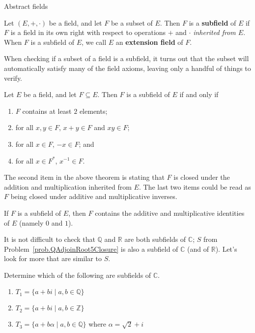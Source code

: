 \begin{section}{Abstract fields}
\begin{definition}
Let $(E,+,\cdot)$ be a field, and let $F$ be a subset of $E$. Then $F$ is a \textbf{subfield} of $E$ if $F$ is a field in its own right with respect to operations $+$ and $\cdot$ \emph{inherited from $E$}. When $F$ is a subfield of $E$, we call $E$  an \textbf{extension field} of $F$.
\end{definition}

When checking if a subset of a field is a subfield, it turns out that the subset will automatically satisfy many of the field axioms, leaving only a handful of things to verify.

\begin{theorem}
Let $E$ be a field, and let $F\subseteq E$. Then $F$ is a subfield of $E$ if and only if 
\begin{enumerate}
\item $F$ contains at least $2$ elements;
\item for all $x,y\in F$, $x+y\in F$ and  $xy\in F$;
\item for all $x\in F$, $-x\in F$; and 
\item for all $x\in F^*$, $x^{-1}\in F$.
\end{enumerate}
\end{theorem}

The second item in the above theorem is stating that $F$ is closed under the addition and multiplication inherited from $E$. The last two items could be read as $F$ being closed under additive and multiplicative inverses.

\begin{theorem}\label{thm.SubfieldContains01}
If $F$ is a subfield of $E$, then $F$ contains the additive and multiplicative identities of $E$ (namely $0$ and $1$).
\end{theorem}

It is not difficult to check that $\mathbb{Q}$ and $\mathbb{R}$ are both subfields of $\mathbb{C}$; $S$ from Problem~\ref{prob.QAdjoinRoot5Closure} is also a subfield of $\mathbb{C}$ (and of $\mathbb{R}$). Let's look for more that are similar to $S$.

\begin{problem}\label{prob.SubfieldRoot2PlusI}
Determine which of the following are subfields of $\mathbb{C}$.
\begin{enumerate}
\item\label{prob.SubfieldRoot2PlusI.QAdjoinI} $T_1=\{a+bi\mid a,b\in \mathbb{Q}\}$
\item $T_2=\{a+bi\mid a,b\in \mathbb{Z}\}$
\item\label{prob.SubfieldRoot2PlusI.QAdjoinRoot2PlusI} $T_3=\{a+b\alpha\mid a,b\in \mathbb{Q}\}$ where  $\alpha = \sqrt{2} + i$
\end{enumerate}
\end{problem}



\end{section}
